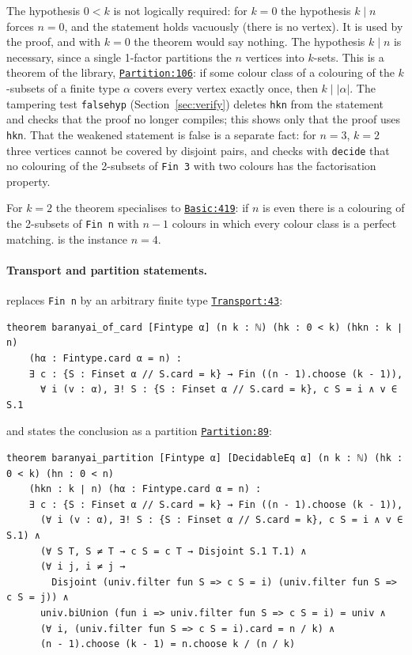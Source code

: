 \documentclass[11pt]{article}
\theoremstyle{definition}
\theoremstyle{remark}
\newcommand{\lean}[1]{\texttt{#1}}
\newcommand{\repo}{https://github.com/jpbald93/baranyai}
\newcommand{\commit}{051ae8c4063be0bb70f1726e9f60d0319dd37d91}
\newcommand{\src}[2]{\href{\repo/blob/\commit/Baranyai/#1.lean\#L#2}{\texttt{#1:#2}}}
\begin{document}
The hypothesis $0<k$ is not logically required: for $k=0$ the hypothesis $k\mid n$ forces $n=0$,
and the statement holds vacuously (there is no vertex). It is used by the proof, and with $k=0$
the theorem would say nothing. The hypothesis $k\mid n$ is necessary, since a single 1-factor
partitions the $n$ vertices into $k$-sets. This is a theorem of the library,
 \src{Partition}{106}: if some colour class of a colouring
of the $k$-subsets of a finite type $\alpha$ covers every vertex exactly once, then $k\mid|\alpha|$.
The tampering test \lean{falsehyp} (Section~\ref{sec:verify}) deletes \lean{hkn} from the statement
and checks that the proof no longer compiles; this shows only that the proof uses \lean{hkn}. That
the weakened statement is false is a separate fact: for $n=3$, $k=2$ three vertices cannot be
covered by disjoint pairs, and  checks with \lean{decide} that no
colouring of the 2-subsets of \lean{Fin 3} with two colours has the factorisation property.

For $k=2$ the theorem specialises to  \src{Basic}{419}:
if $n$ is even there is a colouring of the 2-subsets of \lean{Fin n} with $n-1$ colours in which
every colour class is a perfect matching.  is the instance $n=4$.

\paragraph{Transport and partition statements.}  replaces \lean{Fin n} by an
arbitrary finite type \src{Transport}{43}:
\begin{lstlisting}
theorem baranyai_of_card [Fintype α] (n k : ℕ) (hk : 0 < k) (hkn : k ∣ n)
    (hα : Fintype.card α = n) :
    ∃ c : {S : Finset α // S.card = k} → Fin ((n - 1).choose (k - 1)),
      ∀ i (v : α), ∃! S : {S : Finset α // S.card = k}, c S = i ∧ v ∈ S.1
\end{lstlisting}
and  states the conclusion as a partition \src{Partition}{89}:
\begin{lstlisting}
theorem baranyai_partition [Fintype α] [DecidableEq α] (n k : ℕ) (hk : 0 < k) (hn : 0 < n)
    (hkn : k ∣ n) (hα : Fintype.card α = n) :
    ∃ c : {S : Finset α // S.card = k} → Fin ((n - 1).choose (k - 1)),
      (∀ i (v : α), ∃! S : {S : Finset α // S.card = k}, c S = i ∧ v ∈ S.1) ∧
      (∀ S T, S ≠ T → c S = c T → Disjoint S.1 T.1) ∧
      (∀ i j, i ≠ j →
        Disjoint (univ.filter fun S => c S = i) (univ.filter fun S => c S = j)) ∧
      univ.biUnion (fun i => univ.filter fun S => c S = i) = univ ∧
      (∀ i, (univ.filter fun S => c S = i).card = n / k) ∧
      (n - 1).choose (k - 1) = n.choose k / (n / k)
\end{lstlisting}
\end{document}
